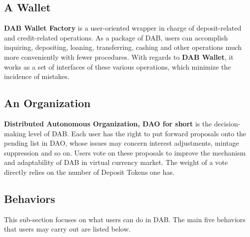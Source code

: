 \documentclass[review]{elsarticle}
\begin{document}
\subsection{A Wallet}
\textbf{DAB Wallet Factory} is a user-oriented wrapper in charge of deposit-related and credit-related operations. As a package of DAB, users can accomplish inquiring, depositing, loaning, transferring, cashing and other operations much more conveniently with fewer procedures. With regards to \textbf{DAB Wallet}, it works as a set of interfaces of these various operations, which minimize the incidence of mistakes.

\subsection{An Organization}
\textbf{Distributed Autonomous Organization, DAO for short} is the decision-making level of DAB. Each user has the right to put forward proposals onto the pending list in DAO, whose issues may concern interest adjustments, mintage suppression and so on. Users vote on these proposals to improve the mechanism and adaptability of DAB in virtual currency market. The weight of a vote directly relies on the number of Deposit Tokens one has.

\subsection{Behaviors}
This sub-section focuses on what users can do in DAB. The main five behaviors that users may carry out are listed below.
\end{document}
